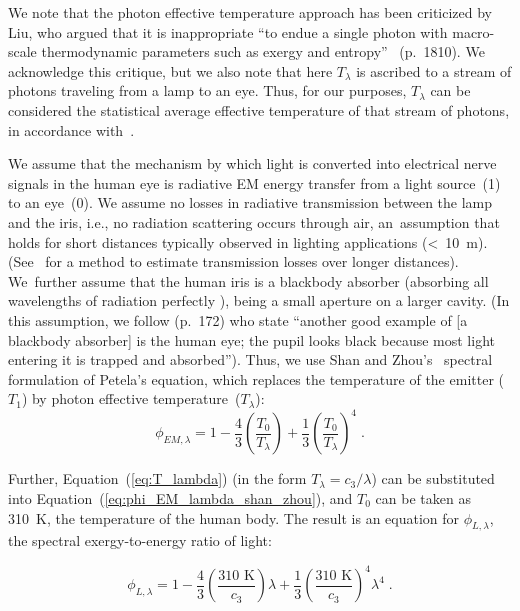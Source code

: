 \documentclass[energies,article,accept,moreauthors,pdftex]{Definitions/mdpi}\usepackage[]{graphicx}\usepackage[]{color}
\newcommand{\EM}{E \! M}
\begin{document}
We note that the photon effective temperature approach has been criticized by 
Liu,
who argued that it is inappropriate
``to endue a single photon with macro-scale thermodynamic parameters
such as exergy and entropy''~\citep{liu2009} (p.~1810).  We acknowledge this critique, 
but we also note that here $T_\lambda$ is ascribed to a stream of photons
traveling from a lamp to an eye.
Thus, for our purposes, $T_\lambda$ can be considered the statistical average effective temperature 
of that stream of photons,
in accordance with~\citet{Shan2019}.

We assume that the mechanism
by which light is converted into electrical nerve signals
in the human eye
is radiative EM energy transfer
from a light source~(1) to an eye~(0).
We assume no losses in radiative transmission
between the lamp and the iris,
i.e., no radiation scattering occurs through air, 
\mbox{an assumption} that holds for short distances typically 
observed in lighting applications (<~10~m).
(\mbox{See \citet{Shan2019}} for a method to estimate transmission losses
over longer distances).
\mbox{We further} assume that the human iris is a blackbody absorber 
(absorbing all wavelengths of radiation perfectly \cite{benenson2006handbook}), 
being a small aperture on a larger cavity.
(In this assumption, we follow  \citet{Rossing2020}  (p.~172) who state
``another good example of [a blackbody absorber] is the human eye;
the pupil looks black because most light entering it is trapped and absorbed'').
Thus, we use Shan and Zhou's~\cite{Shan2019} spectral formulation of Petela's equation,
which replaces the temperature of the emitter ($T_1$) by photon effective temperature~($T_\lambda$):
\begin{equation} \label{eq:phi_EM_lambda_shan_zhou}
 \phi_{\EM,\lambda} = 1 - \frac{4}{3} \left( \frac{T_{0}}{T_{\lambda}} \right)
                        + \frac{1}{3} \left(\frac{T_{0}}{T_{\lambda}}\right)^4 \; .
\end{equation}

Further, Equation~(\ref{eq:T_lambda}) (in the form $T_\lambda = c_3 / \lambda$)
can be substituted into Equation~(\ref{eq:phi_EM_lambda_shan_zhou}),
and $T_0$ can be taken as 310~K, the temperature of the human body.
The result is an equation for $\phi_{L,\lambda}$, the spectral exergy-to-energy ratio of light:

\begin{equation} \label{eq:phi_L_lambda_shan_zhou}
 \phi_{L,\lambda} = 1 
                    - \frac{4}{3} \left( \frac{310 \text{ K}}{c_3} \right) \lambda 
                    + \frac{1}{3} \left( \frac{310 \text{ K}}{c_3} \right)^4 \lambda^4 \; .
\end{equation}
\end{document}
